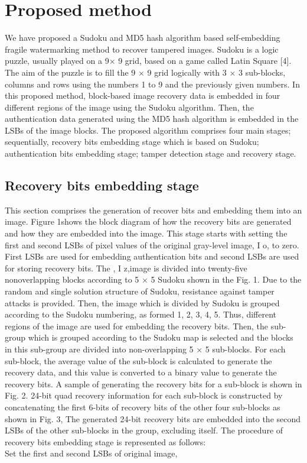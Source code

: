 \documentclass[a4paper, 12pt]{gji}
\begin{document}
\section{Proposed method}

We have proposed a Sudoku and MD5 hash algorithm based self-embedding fragile watermarking method to recover tampered images. Sudoku is a logic puzzle, usually played on a 9× 9 grid, based on a game called Latin Square [4]. The aim of the puzzle is to fill the 9 $\times$ 9 grid logically with 3 $\times$ 3 sub-blocks, columns and rows using the numbers 1 to 9 and the previously given numbers. In this proposed method, block-based image recovery data is embedded in four different regions of the image using the Sudoku algorithm. Then, the authentication data generated using the MD5 hash algorithm is embedded in the LSBs of the image blocks. The proposed algorithm comprises four main stages; sequentially, recovery bits embedding stage which is based on Sudoku; authentication bits embedding stage; tamper detection stage and recovery stage. 

\subsection{Recovery bits embedding stage}

This section comprises the generation of recover bits and embedding them into an image. Figure 1shows the block diagram of how the recovery bits are generated and how they are embedded into the image. This stage starts with setting the first and second LSBs of pixel values of the original gray-level image, I o, to zero. First LSBs are used for embedding authentication bits and second LSBs are used for storing recovery bits. The , I z,image is divided into twenty-five nonoverlapping blocks according to 5 $\times$ 5 Sudoku shown in the Fig. 1. Due to the random and single solution structure of Sudoku, resistance against tamper attacks is provided. Then, the image which is divided by Sudoku is grouped according to the Sudoku numbering, as formed 1, 2, 3, 4, 5. Thus, different regions of the image are used for embedding the recovery bits. Then, the sub-group which is grouped according to the Sudoku map is selected and the blocks in this sub-group are divided into non-overlapping 5 $\times$ 5 sub-blocks. For each sub-block, the average value of the sub-block is calculated to generate the recovery data, and this value is converted to a binary value to generate the recovery bits. A sample of generating the recovery bits for a sub-block is shown in Fig. 2. 24-bit quad recovery information for each sub-block is constructed by concatenating the first 6-bits of recovery bits of the other four sub-blocks as shown in Fig. 3, The generated 24-bit recovery bits are embedded into the second LSBs of the other sub-blocks in the group, excluding itself. The procedure of recovery bits embedding stage is represented as follows:\\ Set the first and second LSBs of original image,
\end{document}
